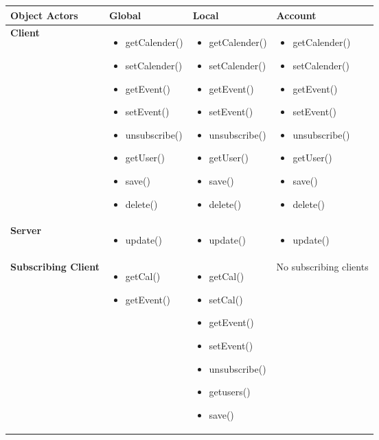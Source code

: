\begin{tabular}{|p{2.9cm}|p{3.6cm}|p{3.6cm}|p{3.6cm}|}
\hline
\textbf{Object Actors}
&
\textbf{Global}
&
\textbf{Local}
&
\textbf{Account} \\
\hline
\textbf{Client}
& 
\begin{itemize}
\item getCalender() 
\item setCalender() 
\item getEvent()
\item setEvent()
\item unsubscribe()
\item getUser()
\item save()
\item delete()
\end{itemize} 
& 
\begin{itemize}
\item getCalender() 
\item setCalender() 
\item getEvent() 
\item setEvent()
\item unsubscribe()
\item getUser()
\item save()
\item delete()
\end{itemize} 
&
\begin{itemize}
\item getCalender() 
\item setCalender() 
\item getEvent() 
\item setEvent()
\item unsubscribe()
\item getUser()
\item save()
\item delete()
\end{itemize} 
 \\ \hline
\textbf{Server}
& 
\begin{itemize}
\item update()
\end{itemize} 
& 
\begin{itemize}
\item update()
\end{itemize} 
&
\begin{itemize}
\item update()
\end{itemize} 
 \\ \hline
\textbf{Subscribing Client}
& 
\begin{itemize}
\item getCal()
\item getEvent()
\end{itemize} 
& 
\begin{itemize}
\item getCal()
\item setCal() 
\item getEvent()
\item setEvent()
\item unsubscribe()
\item getusers()
\item save()
\end{itemize}
&
No subscribing clients
 \\ \hline
\end{tabular}
